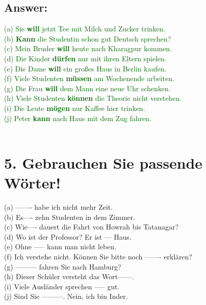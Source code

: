 \documentclass[a4paper,12pt]{article}
\begin{document}
\subsection*{Answer:}
\textcolor{darkgreen}{(a) Sie \textbf{will} jetzt Tee mit Milch und Zucker trinken.}\\
\textcolor{darkgreen}{(b) \textbf{Kann} die Studentin schon gut Deutsch sprechen?}\\
\textcolor{darkgreen}{(c) Mein Bruder \textbf{will} heute nach Kharagpur kommen.}\\
\textcolor{darkgreen}{(d) Die Kinder \textbf{dürfen} nur mit ihren Eltern spielen.}\\
\textcolor{darkgreen}{(e) Die Dame \textbf{will} ein großes Haus in Berlin kaufen.}\\
\textcolor{darkgreen}{(f) Viele Studenten \textbf{müssen} am Wochenende arbeiten.}\\
\textcolor{darkgreen}{(g) Die Frau \textbf{will} dem Mann eine neue Uhr schenken.}\\
\textcolor{darkgreen}{(h) Viele Studenten \textbf{können} die Theorie nicht verstehen.}\\
\textcolor{darkgreen}{(i) Die Leute \textbf{mögen} nur Kaffee hier trinken.}\\
\textcolor{darkgreen}{(j) Peter \textbf{kann} nach Haus mit dem Zug fahren.}\\
\

\vspace{1cm}

\section*{5. Gebrauchen Sie passende Wörter!}

(a) ------- habe ich nicht mehr Zeit.\\
(b) Es---- zehn Studenten in dem Zimmer.\\
(c) Wie---- dauert die Fahrt von Howrah bis Tatanagar?\\
(d) Wo ist der Professor? Er ist --- Haus.\\
(e) Ohne ----- kann man nicht leben.\\
(f) Ich verstehe nicht. Können Sie bitte noch ------- erklären?\\
(g) --------- fahren Sie nach Hamburg?\\
(h) Dieser Schüler versteht das Wort------.\\
(i) Viele Ausländer sprechen ----- gut.\\ 
(j) Sind Sie ---------. Nein, ich bin Inder.
\end{document}
